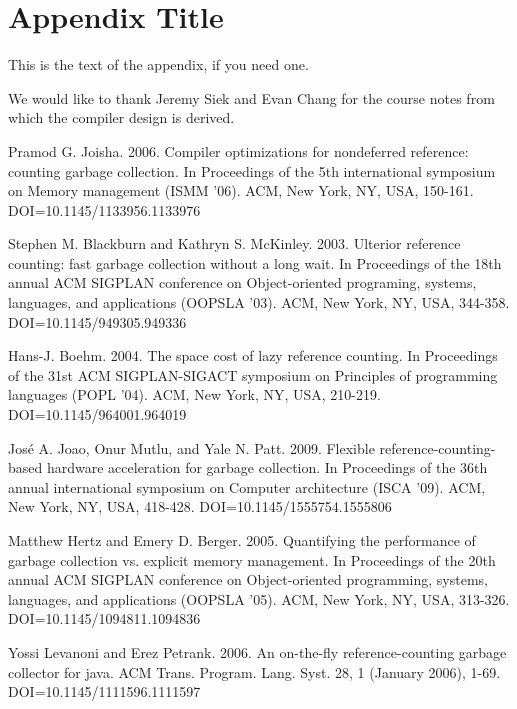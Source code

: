 \documentclass{sigplanconf}
\begin{document}
\section{Appendix Title}

This is the text of the appendix, if you need one.

\acks

We would like to thank Jeremy Siek and Evan Chang for the course notes from which the compiler design is derived.





\begin{thebibliography}{}
\softraggedright
{}
Pramod G. Joisha. 2006. Compiler optimizations for nondeferred reference: counting garbage collection. In Proceedings of the 5th international symposium on Memory management (ISMM '06). ACM, New York, NY, USA, 150-161. DOI=10.1145/1133956.1133976

Stephen M. Blackburn and Kathryn S. McKinley. 2003. Ulterior reference counting: fast garbage collection without a long wait. In Proceedings of the 18th annual ACM SIGPLAN conference on Object-oriented programing, systems, languages, and applications (OOPSLA '03). ACM, New York, NY, USA, 344-358. DOI=10.1145/949305.949336

Hans-J. Boehm. 2004. The space cost of lazy reference counting. In Proceedings of the 31st ACM SIGPLAN-SIGACT symposium on Principles of programming languages (POPL '04). ACM, New York, NY, USA, 210-219. DOI=10.1145/964001.964019 

José A. Joao, Onur Mutlu, and Yale N. Patt. 2009. Flexible reference-counting-based hardware acceleration for garbage collection. In Proceedings of the 36th annual international symposium on Computer architecture (ISCA '09). ACM, New York, NY, USA, 418-428. DOI=10.1145/1555754.1555806

Matthew Hertz and Emery D. Berger. 2005. Quantifying the performance of garbage collection vs. explicit memory management. In Proceedings of the 20th annual ACM SIGPLAN conference on Object-oriented programming, systems, languages, and applications (OOPSLA '05). ACM, New York, NY, USA, 313-326. DOI=10.1145/1094811.1094836  

Yossi Levanoni and Erez Petrank. 2006. An on-the-fly reference-counting garbage collector for java. ACM Trans. Program. Lang. Syst. 28, 1 (January 2006), 1-69. DOI=10.1145/1111596.1111597 

\end{thebibliography}
\end{document}
